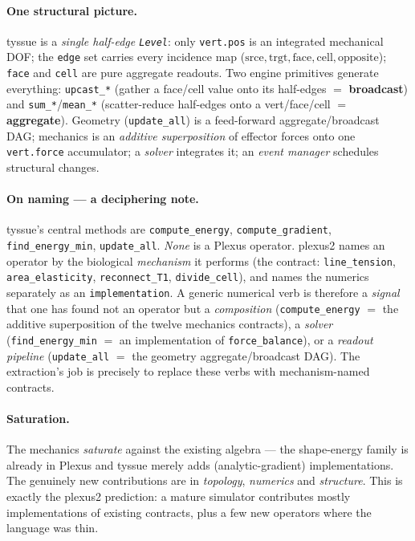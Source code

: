 \documentclass[11pt]{article}
\begin{document}
\paragraph{One structural picture.} tyssue is a \emph{single half-edge \texttt{Level}}: only
\texttt{vert.pos} is an integrated mechanical DOF; the \texttt{edge} set carries every incidence
map ($\mathrm{srce},\mathrm{trgt},\mathrm{face},\mathrm{cell},\mathrm{opposite}$); \texttt{face}
and \texttt{cell} are pure aggregate readouts. Two engine primitives generate everything:
\texttt{upcast\_*} (gather a face/cell value onto its half-edges $=$ \textbf{broadcast}) and
\texttt{sum\_*}/\texttt{mean\_*} (scatter-reduce half-edges onto a vert/face/cell $=$
\textbf{aggregate}). Geometry (\texttt{update\_all}) is a feed-forward aggregate/broadcast DAG;
mechanics is an \emph{additive superposition} of effector forces onto one \texttt{vert.force}
accumulator; a \emph{solver} integrates it; an \emph{event manager} schedules structural changes.

\paragraph{On naming --- a deciphering note.} tyssue's central methods are
\texttt{compute\_energy}, \texttt{compute\_gradient}, \texttt{find\_energy\_min},
\texttt{update\_all}. \emph{None} is a Plexus operator. plexus2 names an operator by the biological
\emph{mechanism} it performs (the contract: \texttt{line\_tension}, \texttt{area\_elasticity},
\texttt{reconnect\_T1}, \texttt{divide\_cell}), and names the numerics separately as an
\texttt{implementation}. A generic numerical verb is therefore a \emph{signal} that one has found
not an operator but a \emph{composition} (\texttt{compute\_energy} $=$ the additive superposition
of the twelve mechanics contracts), a \emph{solver} (\texttt{find\_energy\_min} $=$ an
implementation of \texttt{force\_balance}), or a \emph{readout pipeline} (\texttt{update\_all} $=$
the geometry aggregate/broadcast DAG). The extraction's job is precisely to replace these verbs
with mechanism-named contracts.

\paragraph{Saturation.} The mechanics \emph{saturate} against the existing algebra --- the
shape-energy family is already in Plexus and tyssue merely adds (analytic-gradient)
implementations. The genuinely new contributions are in \emph{topology}, \emph{numerics} and
\emph{structure}. This is exactly the plexus2 prediction: a mature simulator contributes mostly
implementations of existing contracts, plus a few new operators where the language was thin.
\end{document}

